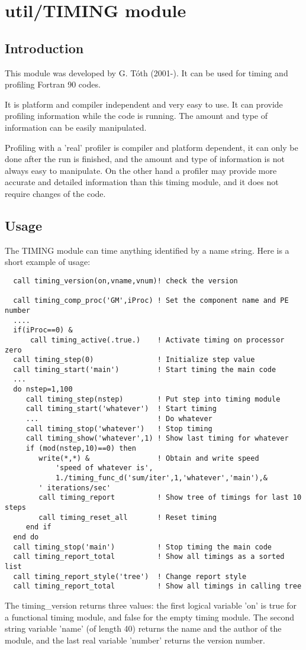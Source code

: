 \section{util/TIMING module}

\subsection{Introduction}

This module was developed by G. T\'oth (2001-).
It can be used for timing and profiling Fortran 90 codes.

It is platform and compiler independent and very easy to use.
It can provide profiling information while the code is running.
The amount and type of information can be easily manipulated.

Profiling with a 'real' profiler is compiler and platform dependent, 
it can only be done after the run is finished, and the amount and
type of information is not always easy to manipulate. On the other hand
a profiler may provide more accurate and detailed information than 
this timing module, and it does not require changes of the code.

\subsection{Usage}

The TIMING module can time anything identified by a name string.
Here is a short example of usage:
{\footnotesize
\begin{verbatim}
  call timing_version(on,vname,vnum)! check the version

  call timing_comp_proc('GM',iProc) ! Set the component name and PE number
  ....
  if(iProc==0) &
      call timing_active(.true.)    ! Activate timing on processor zero
  call timing_step(0)               ! Initialize step value
  call timing_start('main')         ! Start timing the main code
  ...
  do nstep=1,100
     call timing_step(nstep)        ! Put step into timing module
     call timing_start('whatever')  ! Start timing
     ...                            ! Do whatever
     call timing_stop('whatever')   ! Stop timing
     call timing_show('whatever',1) ! Show last timing for whatever 
     if (mod(nstep,10)==0) then
        write(*,*) &                ! Obtain and write speed
            'speed of whatever is',
            1./timing_func_d('sum/iter',1,'whatever','main'),&
	    ' iterations/sec'
        call timing_report          ! Show tree of timings for last 10 steps
        call timing_reset_all       ! Reset timing
     end if
  end do
  call timing_stop('main')          ! Stop timing the main code
  call timing_report_total          ! Show all timings as a sorted list
  call timing_report_style('tree')  ! Change report style
  call timing_report_total          ! Show all timings in calling tree
\end{verbatim}
}
The timing\_version returns three values: the first logical variable
'on' is true for a functional timing module, and false for
the empty timing module. The second string variable 'name' (of length 40)
returns the name and the author of the module, and the last real variable
'number' returns the version number. 

